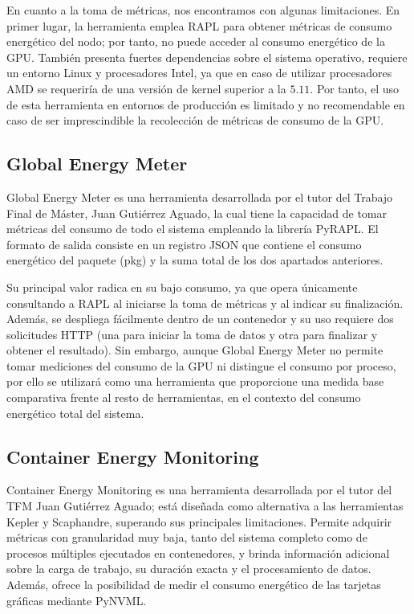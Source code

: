   En cuanto a la toma de métricas, nos encontramos con algunas limitaciones. En primer lugar, la herramienta emplea RAPL para obtener métricas de consumo energético del nodo; por tanto, no puede acceder al consumo energético de la GPU. También presenta fuertes dependencias sobre el sistema operativo, requiere un entorno Linux y procesadores Intel, ya que en caso de utilizar procesadores AMD se requeriría de una versión de kernel superior a la $5.11$. Por tanto, el uso de esta herramienta en entornos de producción es limitado y no recomendable en caso de ser imprescindible la recolección de métricas de consumo de la GPU.

\subsection*{Global Energy Meter}
 Global Energy Meter es una herramienta desarrollada por el tutor del Trabajo Final de Máster, Juan Gutiérrez Aguado, la cual tiene la capacidad de tomar métricas del consumo de todo el sistema empleando la librería PyRAPL. El formato de salida consiste en un registro JSON que contiene el consumo energético del paquete (pkg) y la suma total de los dos apartados anteriores.

  Su principal valor radica en su bajo consumo, ya que opera únicamente consultando a RAPL al iniciarse la toma de métricas y al indicar su finalización. Además, se despliega fácilmente dentro de un contenedor y su uso requiere dos solicitudes HTTP (una para iniciar la toma de datos y otra para finalizar y obtener el resultado). Sin embargo, aunque Global Energy Meter no permite tomar mediciones del consumo de la GPU ni distingue el consumo por proceso, por ello se utilizará como una herramienta que proporcione una medida base comparativa frente al resto de herramientas, en el contexto del consumo energético total del sistema.

\subsection*{Container Energy Monitoring}
  Container Energy Monitoring es una herramienta desarrollada por el tutor del TFM Juan Gutiérrez Aguado; está diseñada como alternativa a las herramientas Kepler y Scaphandre, superando sus principales limitaciones. Permite adquirir métricas con granularidad muy baja, tanto del sistema completo como de procesos múltiples ejecutados en contenedores, y brinda información adicional sobre la carga de trabajo, su duración exacta y el procesamiento de datos. Además, ofrece la posibilidad de medir el consumo energético de las tarjetas gráficas mediante PyNVML.\ 

